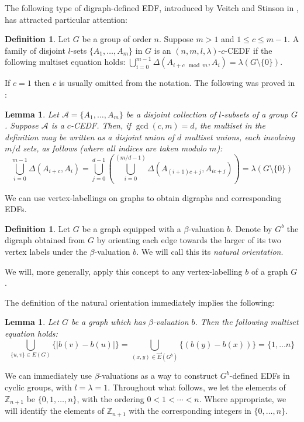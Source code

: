 \documentclass[12pt, a4paper]{article}
\newtheorem{lemma}[theorem]{Lemma}
\theoremstyle{definition}
\newtheorem{definition}[theorem]{Definition}
\begin{document}
The following type of digraph-defined EDF, introduced by Veitch and Stinson in \cite{VeiSti}, has attracted particular attention:
\begin{definition}
Let $G$ be a group of order $n$. Suppose $m>1$ and $1 \leq c \leq m-1$.   A family of disjoint $l$-sets $\{A_1, \ldots, A_m\}$ in $G$ is an $(n, m, l,\lambda)$-$c$-CEDF if the following multiset equation holds:
$ \bigcup_{i=0}^{m-1} \Delta(A_{i+c \mod m}, A_i)=\lambda (G \setminus \{0\})$.
\end{definition}

If $c=1$ then $c$ is usually omitted from the notation.  The following was proved in \cite{HucJefMcC}:

\begin{lemma}\label{lemma:CEDF}
Let $\mathcal{A}=\{A_1, \ldots, A_m\}$ be a disjoint collection of $l$-subsets of a group $G$. Suppose $\mathcal{A}$ is a $c$-CEDF.  Then, if $\gcd(c,m)=d$, the multiset in the definition may be written as a disjoint union of $d$ multiset unions, each involving $m/d$ sets, as follows (where all indices are taken modulo $m$):
$$ \bigcup_{i=0}^{m-1} \Delta(A_{i+c}, A_i)=\bigcup_{j=0}^{d-1} \left(\bigcup_{i=0}^{(m/d-1)} \Delta(A_{(i+1)c+j},A_{ic+j}) \right)=\lambda(G \setminus \{0\})$$
\end{lemma}

We can use vertex-labellings on graphs to obtain digraphs and corresponding EDFs.

\begin{definition}
Let $G$ be a graph equipped with a $\beta$-valuation $b$.  Denote by $G^b$ the digraph obtained from $G$ by orienting each edge towards the larger of its two vertex labels under the $\beta$-valuation $b$.  We will call this its \emph{natural orientation}.
\end{definition}
We will, more generally, apply this concept to any vertex-labelling $b$ of a graph $G$.

The definition of the natural orientation immediately implies the following:
\begin{lemma}\label{betatodirect}
    Let $G$ be a graph which has $\beta$-valuation $b$. Then the following multiset equation holds:
    \[\bigcup_{\{u,v\}\in E(G)} \{\mid b(v)-b(u) \mid \} = \bigcup_{(x,y)\in \overrightarrow{E}(G^b)} \{(b(y)-b(x) )\} =\{1, \ldots n\}\]
\end{lemma}

We can immediately use $\beta$-valuations as a way to construct $G^b$-defined EDFs in cyclic groups, with $l=\lambda=1$. Throughout what follows, we let the elements of $\mathbb{Z}_{n+1}$ be $\{0,1,\ldots,n\}$, with the ordering $0<1< \cdots <n$.  Where appropriate, we will identify the elements of $\mathbb{Z}_{n+1}$ with the corresponding integers in $\{0,\ldots,n\}$.
\end{document}
